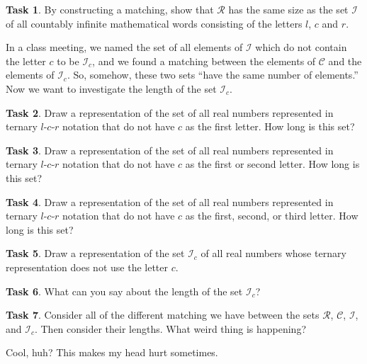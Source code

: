 \documentclass[10pt]{amsart}
\theoremstyle{definition}
\newtheorem{task}{Task}
\begin{document}
\begin{task}
By constructing a matching, show that $\mathcal{R}$ has the same size as the set $\mathcal{I}$ of all countably infinite mathematical words consisting of the letters $l$, $c$ and $r$.\\
\end{task}

In a class meeting, we named the set of all elements of $\mathcal{I}$ which do not contain the letter $c$ to be $\mathcal{I}_c$, and we found a matching between the elements of $\mathcal{C}$ and the elements of $\mathcal{I}_c$.
So, somehow, these two sets ``have the same number of elements.'' 
Now we want to investigate the length of the set $\mathcal{I}_c$.\\

\begin{task}
Draw a representation of the set of all real numbers represented in ternary $l$-$c$-$r$ notation that do not have $c$ as the first letter.
How long is this set?\\
\end{task}

\begin{task}
Draw a representation of the set of all real numbers represented in ternary $l$-$c$-$r$ notation that do not have $c$ as the first or second letter. How long is this set? \\
\end{task}

\begin{task}
Draw a representation of the set of all real numbers represented in ternary $l$-$c$-$r$ notation that do not have $c$ as the first, second, or third letter.
How long is this set? \\
\end{task}

\begin{task}
Draw a representation of the set $\mathcal{I}_c$ of all real numbers whose ternary representation does not use the letter $c$. \\
\end{task}

\begin{task}
What can you say about the length of the set $\mathcal{I}_c$?
\end{task}

\begin{task}
Consider all of the different matching we have between the sets $\mathcal{R}$, $\mathcal{C}$, $\mathcal{I}$, and $\mathcal{I}_c$. Then consider their lengths. What weird thing is happening?
\end{task}

Cool, huh? This makes my head hurt sometimes.
\end{document}
